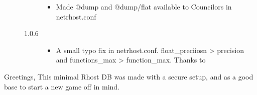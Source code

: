 \documentclass[letterpaper,10pt,english]{sphinxmanual}
\begin{document}
\begin{description}
\begin{description}
\begin{itemize}
\item {} 
\sphinxAtStartPar
Made @dump and @dump/flat available to Councilors in netrhost.conf

\end{itemize}

\item[{1.0.6}] \leavevmode\begin{itemize}
\item {} 
\sphinxAtStartPar
A small typo fix in netrhost.conf. float\_preciiosn \sphinxhyphen{}\textgreater{} precision and
functions\_max \sphinxhyphen{}\textgreater{} function\_max. Thanks to 

\end{itemize}

\end{description}

\end{description}

\sphinxAtStartPar
Greetings,
This minimal Rhost DB was made with a secure setup, and as a good base to start
a new game off in mind.
\end{document}
